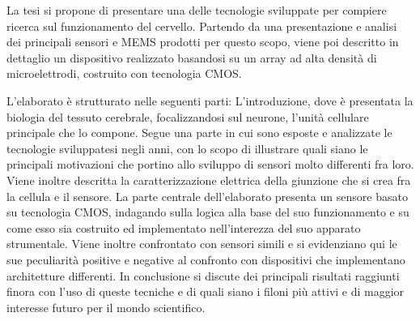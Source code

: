 \documentclass[%
corpo=11 pt,
twoside,
oldstyle,
autoretitolo,
greek,
evenboxes,
]{toptesi}\errorcontextlines=100%
\begin{document}

	

	
	\sommario
	La tesi si propone di presentare una delle tecnologie sviluppate per compiere ricerca sul funzionamento del cervello. Partendo da una presentazione e analisi dei principali sensori e MEMS prodotti per questo scopo, viene poi descritto in dettaglio un dispositivo realizzato basandosi su un array ad alta densità di microelettrodi, costruito con tecnologia CMOS.
	
	L’elaborato è strutturato nelle seguenti parti:
	L’introduzione, dove è presentata la biologia del tessuto cerebrale, focalizzandosi sul neurone, l’unità cellulare principale che lo compone. Segue una parte in cui sono esposte e analizzate le tecnologie sviluppatesi negli anni, con lo scopo di illustrare quali siano le principali motivazioni che portino allo sviluppo di sensori molto differenti fra loro. Viene inoltre descritta la caratterizzazione elettrica della giunzione che si crea fra la cellula e il sensore.  
	La parte centrale dell’elaborato presenta un sensore basato su tecnologia CMOS, indagando sulla logica alla base del suo funzionamento e su come esso sia costruito ed implementato nell’interezza del suo apparato strumentale. Viene inoltre confrontato con sensori simili e si evidenziano qui le sue peculiarità positive e negative al confronto con dispositivi che implementano architetture differenti.
	In conclusione si discute dei principali risultati raggiunti finora con l’uso di queste tecniche e di quali siano i filoni più attivi e di maggior interesse futuro per il mondo scientifico. 
	
\end{document}
